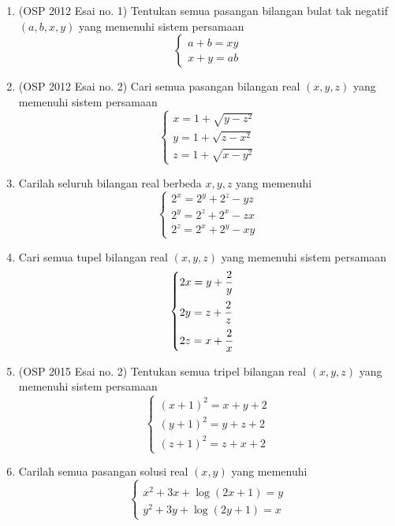 \documentclass[12pt]{scrartcl}
\begin{document}
\begin{enumerate}
    \item (OSP 2012 Esai no. 1) Tentukan semua pasangan bilangan bulat tak negatif $(a,b,x,y)$ yang memenuhi sistem persamaan\\[-10pt] 
		$$\begin{cases}
			a+b=xy \\
			x+y=ab 
		\end{cases}$$
		
    \item (OSP 2012 Esai no. 2) Cari semua pasangan bilangan real $(x,y,z)$ yang memenuhi sistem persamaan\\[-10pt] 
		$$\begin{cases}
			x=1+\sqrt{y-z^2} \\
			y=1+\sqrt{z-x^2} \\
			z=1+\sqrt{x-y^2}
		\end{cases}$$
		
	\item Carilah seluruh bilangan real berbeda $x,y,z$ yang memenuhi \\[-10pt] 
	$$\begin{cases}
			2^x=2^y+2^z-yz \\
			2^y=2^z+2^x-zx \\
			2^z=2^x+2^y-xy
		\end{cases}$$
		
	\item Cari semua tupel bilangan real $(x,y,z)$ yang memenuhi sistem persamaan\\[-10pt] 
		$$\begin{cases}
			\vspace{2mm}
			2x=y+\dfrac{2}{y} \\
			\vspace{2mm}
			2y=z+\dfrac{2}{z} \\
			2z=x+\dfrac{2}{x}
		\end{cases}$$
		
	\item (OSP 2015 Esai no. 2) Tentukan semua tripel bilangan real $(x,y,z)$ yang memenuhi sistem persamaan\\[-10pt]
	    $$\begin{cases}
			(x+1)^2 = x+y+2 \\
			(y+1)^2 = y+z+2 \\
			(z+1)^2 = z+x+2
		\end{cases}$$
		
	\item Carilah semua pasangan solusi real $(x,y)$ yang memenuhi\\[-10pt] 
				 		$$\begin{cases}\\[-30pt]
				 		x^2+3x+\log(2x+1)=y \\[-5pt]
				 		y^2+3y+\log(2y+1)=x
				 		\end{cases}$$
\end{enumerate}
\end{document}
